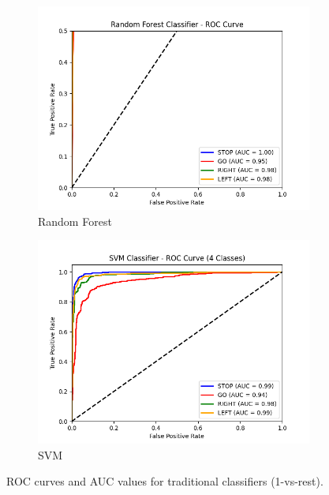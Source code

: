 \begin{figure}[h]
\begin{subfigure}{0.48\textwidth}
    \includegraphics[width=\linewidth]{img/classifier/random_forest_AUC.png}
    \caption{Random Forest}
\end{subfigure}
\begin{subfigure}{0.48\textwidth}
    \includegraphics[width=\linewidth]{img/classifier/SVM_AUC.png}
    \caption{SVM}
\end{subfigure}

\caption{ROC curves and AUC values for traditional classifiers (1-vs-rest).}
\label{fig:comparison_rocs}
\end{figure}





